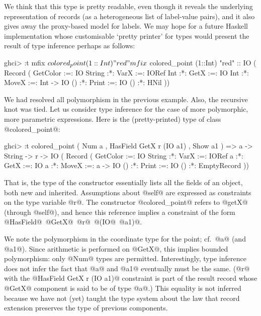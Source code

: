 \documentclass{jfp}
\begin{document}
We think that this type is pretty readable, even though it reveals the
underlying representation of records (as a heterogeneous list of
label-value pairs), and it also gives away the proxy-based model for
labels.  We may hope for a future Haskell implementation whose
customisable `pretty printer' for types would present the result of
type inference perhaps as follows:

\begin{code}
 ghci> :t mfix $ colored_point (1::Int) "red"
 mfix $ colored_point (1::Int) "red" ::
        IO ( Record (
               GetColor :=: IO String
           :*: VarX     :=: IORef Int
           :*: GetX     :=: IO Int
           :*: MoveX    :=: Int -> IO ()
           :*: Print    :=: IO ()
           :*: HNil ))
\end{code} 

We had resolved all polymorphism in the previous example. Also, the
recursive knot was tied. Let us consider type inference for the case
of more polymorphic, more parametric expressions. Here is the
(pretty-printed) type of class @colored_point@:

\begin{code}
 ghci> :t colored_point
 ( Num a
 , HasField GetX r (IO a1)
 , Show a1
 ) => a
   -> String
   -> r
   -> IO ( Record (
             GetColor :=: IO String
         :*: VarX     :=: IORef a
         :*: GetX     :=: IO a
         :*: MoveX    :=: a -> IO ()
         :*: Print    :=: IO ()
         :*: EmptyRecord ))
\end{code}

That is, the type of the constructor essentially lists all the fields
of an object, both new and inherited. Assumptions about @self@ are
expressed as constraints on the type variable @r@. The constructor
@colored_point@ refers to @getX@ (through @self@), and hence this
reference implies a constraint of the form
@HasField@~@GetX@~@r@~@(IO@~@a1)@.

We note the polymorphism in the coordinate type for the point; cf.\
@a@ (and @a1@). Since arithmetic is performed on @GetX@, this implies
bounded polymorphism: only @Num@ types are permitted. Interestingly,
type inference does not infer the fact that @a@ and @a1@ eventually
must be the same. (@r@ with the @HasField GetX r (IO a1)@ constraint
is part of the result record whose @GetX@ component is said to be of
type @a@.)  This equality is not inferred because we have not (yet)
taught the type system about the law that record extension preserves
the type of previous components.
\end{document}
